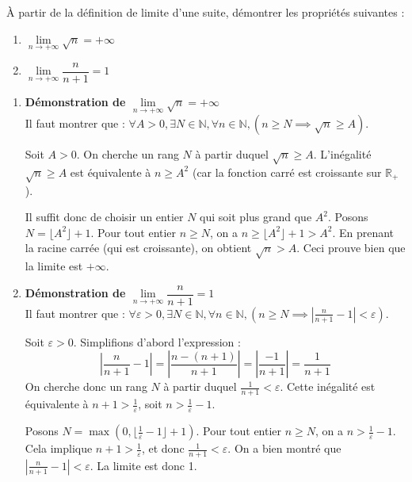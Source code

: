 \documentclass[]{exercices}
\begin{document}

\begin{exercice}[\di]
	À partir de la définition de limite d'une suite, démontrer les propriétés suivantes :
	\begin{multicols}{2}
		\begin{enumerate}
			\item $\lim\limits_{n\to +\infty}\sqrt{n}=+\infty$
			\item $\lim\limits_{n\to +\infty}\dfrac{n}{n+1}=1$
		\end{enumerate}
	\end{multicols}
\end{exercice}

\begin{solution}
	\begin{enumerate}
		\item \textbf{Démonstration de $\lim\limits_{n\to +\infty}\sqrt{n}=+\infty$} \\
		      Il faut montrer que : $\forall A > 0, \exists N \in \mathbb{N}, \forall n \in \mathbb{N}, (n \ge N \implies \sqrt{n} \ge A)$.

		      Soit $A > 0$. On cherche un rang $N$ à partir duquel $\sqrt{n} \ge A$.
		      L'inégalité $\sqrt{n} \ge A$ est équivalente à $n \ge A^2$ (car la fonction carré est croissante sur $\mathbb{R}_+$).

		      Il suffit donc de choisir un entier $N$ qui soit plus grand que $A^2$.
		      Posons $N = \lfloor A^2 \rfloor + 1$.
		      Pour tout entier $n \ge N$, on a $n \ge \lfloor A^2 \rfloor + 1 > A^2$.
		      En prenant la racine carrée (qui est croissante), on obtient $\sqrt{n} > A$.
		      Ceci prouve bien que la limite est $+\infty$.

		\item \textbf{Démonstration de $\lim\limits_{n\to +\infty}\dfrac{n}{n+1}=1$} \\
		      Il faut montrer que : $\forall \varepsilon > 0, \exists N \in \mathbb{N}, \forall n \in \mathbb{N}, (n \ge N \implies |\frac{n}{n+1}-1| < \varepsilon)$.

		      Soit $\varepsilon > 0$. Simplifions d'abord l'expression :
		      \[ \left|\frac{n}{n+1}-1\right| = \left|\frac{n-(n+1)}{n+1}\right| = \left|\frac{-1}{n+1}\right| = \frac{1}{n+1} \]
		      On cherche donc un rang $N$ à partir duquel $\frac{1}{n+1} < \varepsilon$.
		      Cette inégalité est équivalente à $n+1 > \frac{1}{\varepsilon}$, soit $n > \frac{1}{\varepsilon} - 1$.

		      Posons $N = \max(0, \lfloor \frac{1}{\varepsilon} - 1 \rfloor + 1)$.
		      Pour tout entier $n \ge N$, on a $n > \frac{1}{\varepsilon} - 1$.
		      Cela implique $n+1 > \frac{1}{\varepsilon}$, et donc $\frac{1}{n+1} < \varepsilon$.
		      On a bien montré que $|\frac{n}{n+1}-1| < \varepsilon$. La limite est donc 1.
	\end{enumerate}
\end{solution}
\end{document}
